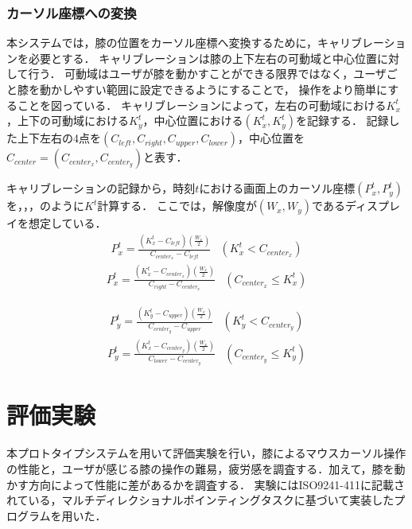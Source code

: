 \documentclass[submit, techrep]{ipsj}
\begin{document}
\subsubsection{カーソル座標への変換}
本システムでは，膝の位置をカーソル座標へ変換するために，キャリブレーションを必要とする．
キャリブレーションは膝の上下左右の可動域と中心位置に対して行う．
可動域はユーザが膝を動かすことができる限界ではなく，ユーザごと膝を動かしやすい範囲に設定できるようにすることで，
操作をより簡単にすることを図っている．
キャリブレーションによって，左右の可動域における$K^t_x$，上下の可動域における$K^t_y$，中心位置における$(K^t_x, K^t_y)$を記録する．
記録した上下左右の4点を$(C_{left},C_{right},C_{upper},C_{lower})$，中心位置を$C_{center}=(C_{center_x},  C_{center_y})$と表す．\par
キャリブレーションの記録から，時刻$t$における画面上のカーソル座標$(P^t_x, P^t_y)$を，，，のように$K^t$計算する．
ここでは，解像度が$(W_x, W_y)$であるディスプレイを想定している．
\begin{eqnarray}
	\label{eq:calc_px1}
	P^t_x = 
		\frac{(K^t_x - C_{left}) \left( \frac{W_x}{2} \right)}{C_{center_x} - C_{left}} & (K^t_x < C_{center_x})
\end{eqnarray}
\begin{eqnarray}
	\label{eq:calc_px2}
	P^t_x = 
		\frac{(K^t_x - C_{center_x}) \left( \frac{W_x}{2} \right)}{C_{right} - C_{center_x}} & (C_{center_x} \leq K^t_x) 
\end{eqnarray}

\begin{eqnarray}
	\label{eq:calc_py1}
	P^t_y = 
		\frac{(K^t_y - C_{upper}) \left( \frac{W_x}{2} \right)}{C_{center_y} - C_{upper}} & (K^t_y < C_{center_y}) 
\end{eqnarray}
\begin{eqnarray}
	\label{eq:calc_py2}
	P^t_y = 
		\frac{(K^t_x - C_{center_y}) \left( \frac{W_x}{2} \right)}{C_{lower} - C_{center_y}} & (C_{center_y} \leq K^t_y)
\end{eqnarray}
\section{評価実験}
本プロトタイプシステムを用いて評価実験を行い，膝によるマウスカーソル操作の性能と，ユーザが感じる膝の操作の難易，疲労感を調査する．加えて，膝を動かす方向によって性能に差があるかを調査する．
実験にはISO9241-411\cite{9241411}に記載されている，マルチディレクショナルポインティングタスクに基づいて実装したプログラムを用いた．
\end{document}
